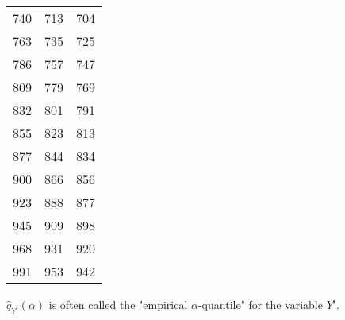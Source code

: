 {\begin{center}
\begin{tabular}{|c|c|c|}
      740 & 713 & 704 \\
      763 & 735 & 725 \\
      786 & 757 & 747 \\
      809 & 779 & 769 \\
      832 & 801 & 791 \\
      855 & 823 & 813 \\
      877 & 844 & 834 \\
      900 & 866 & 856 \\
      923 & 888 & 877 \\
      945 & 909 & 898 \\
      968 & 931 & 920 \\
      991 & 953 & 942 \\
      \hline
    \end{tabular}
  \end{center}

}
{
  $\widehat{q}_{Y^i}(\alpha)$ is often called the "empirical $\alpha$-quantile" for the variable ${Y^i}$.
}


